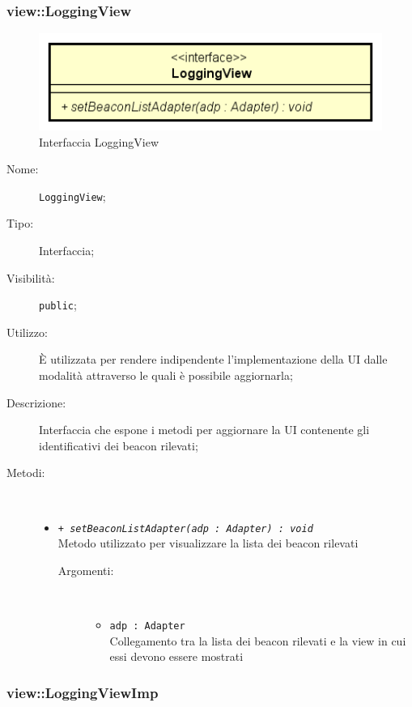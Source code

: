 \documentclass[../DefinizioneDiProdotto.tex]{subfiles}
\begin{document}
\subsubsection{view::LoggingView}

    \begin{figure}[H]
        \centering
        \includegraphics{img/LoggingView.png}
        \caption{Interfaccia LoggingView}\label{fig:view::LoggingView} 
    \end{figure}
    \begin{description}
\item[Nome:] \texttt{LoggingView};
\item[Tipo:] Interfaccia;
\item[Visibilità:] \texttt{public};
\item[Utilizzo:] È utilizzata per rendere indipendente l'implementazione della UI dalle modalità attraverso le quali è possibile aggiornarla;
\item[Descrizione:] Interfaccia che espone i metodi per aggiornare la UI contenente gli identificativi dei beacon rilevati;
\item[Metodi:] \
\begin{itemize}
\item \texttt{+ \textit{setBeaconListAdapter(adp : Adapter) : void}}\\
Metodo utilizzato per visualizzare la lista dei beacon rilevati 
 \begin{description}
\item[Argomenti:] \
\begin{itemize}
\item \texttt{adp : Adapter}\\
Collegamento tra la lista dei beacon rilevati e la view in cui essi devono essere mostrati\end{itemize}
\end{description}
\end{itemize}
\end{description}

\subsubsection{view::LoggingViewImp}
\end{document}
